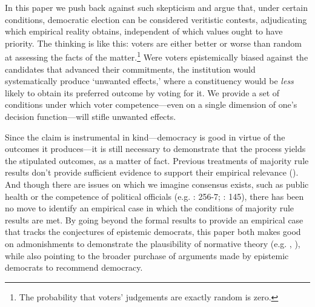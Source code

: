 \documentclass[11pt]{article}
\begin{document}
In this paper we push back against such skepticism and argue that, under certain conditions,
 democratic election can be considered veritistic contests, adjudicating which empirical reality obtains, independent of which values ought to have priority. The thinking is like this: voters are either better or worse than random at assessing the facts of the matter.\footnote{The probability that voters' judgements are exactly random is zero.} Were voters epistemically biased against the candidates that advanced their commitments, the institution would systematically produce `unwanted effects,' where a constituency would be \emph{less} likely to obtain its preferred outcome by voting for it. We provide a set of conditions under which voter competence---even on a single dimension of one's decision function---will stifle unwanted effects.


Since the claim is instrumental in kind---democracy is good in virtue of the outcomes it produces---it is still necessary to demonstrate that the process yields the stipulated outcomes, as a matter of fact. Previous treatments of majority rule results don't provide sufficient evidence to support their empirical relevance
(\cite{schwartzberg2015epistemic}). And though there are issues on which we imagine consensus exists, such as public health or the competence of political officials (e.g. \cite{Page2007}: 256-7; \cite{Landemore13}: 145), there has been no move to identify an empirical case in which the conditions of majority rule results are met. By going beyond the formal results to provide an empirical case that tracks the conjectures of epistemic democrats, this paper both makes good on admonishments to demonstrate the plausibility of normative theory (e.g. \cite{rehfeld2010offensive}, \cite{wiens2015against}), while also pointing to the broader purchase of arguments made by epistemic democrats to recommend democracy.
\end{document}

